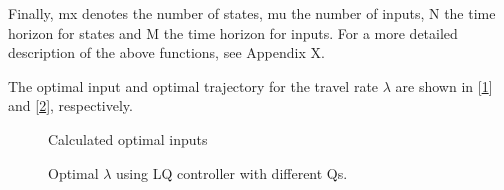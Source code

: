 Finally, mx denotes the number of states, mu the number of inputs, N the time horizon for states and M the time horizon for inputs. For a more detailed description of the above functions, see Appendix X.

The optimal input and optimal trajectory for the travel rate $\lambda$ are shown in [\ref{fig:optimal_inputs}] and [\ref{fig:optimal_lambda}], respectively. 

\begin{figure}[h]
    \centering
    \caption{Calculated optimal inputs}
    \label{fig:optimal_inputs}
\end{figure}

\begin{figure}[H]
    \centering
    \caption{Optimal $\lambda$ using LQ controller with different Qs.}
    \label{fig:optimal_lambda}
\end{figure}


